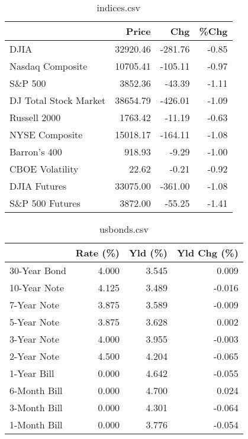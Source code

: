 \documentclass{article}%
\begin{document}
%


\begin{table}[htbp]%
\caption{indices.csv}%
\centering%
\begin{adjustbox}{width=1\textwidth}%
\begin{tabular}{lrrr}
\toprule
                      &    Price &     Chg &  \%Chg \\
\midrule
                 DJIA & 32920.46 & -281.76 & -0.85 \\
     Nasdaq Composite & 10705.41 & -105.11 & -0.97 \\
              S\&P 500 &  3852.36 &  -43.39 & -1.11 \\
DJ Total Stock Market & 38654.79 & -426.01 & -1.09 \\
         Russell 2000 &  1763.42 &  -11.19 & -0.63 \\
       NYSE Composite & 15018.17 & -164.11 & -1.08 \\
         Barron's 400 &   918.93 &   -9.29 & -1.00 \\
      CBOE Volatility &    22.62 &   -0.21 & -0.92 \\
         DJIA Futures & 33075.00 & -361.00 & -1.08 \\
      S\&P 500 Futures &  3872.00 &  -55.25 & -1.41 \\
\bottomrule
\end{tabular}
%
\end{adjustbox}%
\end{table}

%


\begin{table}[htbp]%
\caption{usbonds.csv}%
\centering%
\begin{adjustbox}{width=1\textwidth}%
\begin{tabular}{lrrr}
\toprule
             &  Rate (\%) &  Yld (\%) &  Yld Chg (\%) \\
\midrule
30-Year Bond &     4.000 &    3.545 &        0.009 \\
10-Year Note &     4.125 &    3.489 &       -0.016 \\
 7-Year Note &     3.875 &    3.589 &       -0.009 \\
 5-Year Note &     3.875 &    3.628 &        0.002 \\
 3-Year Note &     4.000 &    3.955 &       -0.003 \\
 2-Year Note &     4.500 &    4.204 &       -0.065 \\
 1-Year Bill &     0.000 &    4.642 &       -0.055 \\
6-Month Bill &     0.000 &    4.700 &        0.024 \\
3-Month Bill &     0.000 &    4.301 &       -0.064 \\
1-Month Bill &     0.000 &    3.776 &       -0.054 \\
\bottomrule
\end{tabular}
%
\end{adjustbox}%
\end{table}
\end{document}
